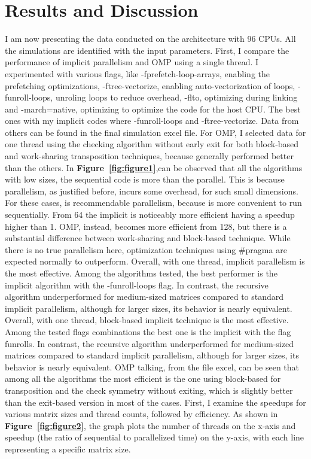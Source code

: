 \section{Results and Discussion}
I am now presenting the data conducted on the architecture with 96 CPUs. All the simulations are identified with the input parameters. First, I compare the performance of implicit parallelism and OMP using a single thread. I experimented with various flags, like -fprefetch-loop-arrays, enabling the prefetching optimizations, -ftree-vectorize, enabling auto-vectorization of loops, -funroll-loops, unroling loops to reduce overhead, -flto, optimizing during linking and -march=native, optimizing to optimize the code for the host CPU. The best ones with my implicit codes where -funroll-loops and -ftree-vectorize. Data from others can be found in the final simulation excel file. For OMP, I selected data for one thread using the checking algorithm without early exit for both block-based and work-sharing transposition techniques, because generally performed better than the others. In \textbf{Figure~\ref{fig:figure1}},can be observed that all the algorithms with low sizes, the sequential code is more than the parallel. This is because parallelism, as justified before, incurs some overhead, for such small dimensions. For these cases, is recommendable parallelism, because is more convenient to run sequentially. From 64 the implicit is noticeably more efficient having a speedup higher than 1. OMP, instead, becomes more efficient from 128, but there is a substantial difference between work-sharing and block-based technique. While there is no true parallelism here, optimization techniques using \#pragma are expected normally to outperform. Overall, with one thread, implicit parallelism is the most effective. Among the algorithms tested, the best performer is the implicit algorithm with the -funroll-loops flag. In contrast, the recursive algorithm underperformed for medium-sized matrices compared to standard implicit parallelism, although for larger sizes, its behavior is nearly equivalent. Overall, with one thread, block-based implicit technique is the most effective. Among the tested flags combinations the best one is the implicit with the flag funrolls. In contrast, the recursive algorithm underperformed for medium-sized matrices compared to standard implicit parallelism, although for larger sizes, its behavior is nearly equivalent. 
OMP talking, from the file excel, can be seen that among all the algorithms the most efficient is the one using block-based for transposition and the check symmetry without exiting, which is slightly better than the exit-based version in most of the cases. First, I examine the speedups for various matrix sizes and thread counts, followed by efficiency. As shown in \textbf{Figure~\ref{fig:figure2}}, the graph plots the number of threads on the x-axis and speedup (the ratio of sequential to parallelized time) on the y-axis, with each line representing a specific matrix size.
